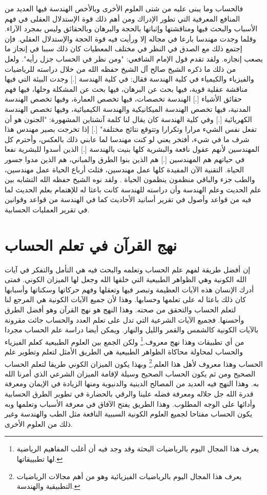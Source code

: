 فالحساب وما يبنى عليه من شتى العلوم الأخرى وبالأخص الهندسة فيها العديد من المنافع المعرفية التي تطور الإدراك ومن أهم ذلك قوة الإستدلال العقلى في فهم الأسباب والبحث فيها ومناقشتها وإثباتها بالحجة والبرهان وبالحقائق وليس بمجرد الآراء. وقلما وجدت مهندسا بارعا في مجاله إلا ورأيت فيه قوة الحجة والإستدلال العقلي. فإن إجتمع ذلك مع الصدق في النظر في مختلف المعطيات كان ذلك سببا في إنجاز ما يصعب إنجازه. ولقد تقدم قول الإمام الشافعي: "ومن نظر في الحساب جزل رأيه". ولعل من ذلك ما ذكره الشيخ صالح آل الشيخ حفظه الله من خلال دراسته للرياضيات والفيزياء والكيمياء في كلية الهندسة فقال: في كلية الهندسة [.] وجدت البيئة التي فيها مناقشة عقلية قوية، فيها بحث عن البرهان، فيها بحث عن المشكلة وحلها، فيها فهم حقائق الأشياء [.] الهندسة تخصصات، فيها تخصص العمارة، وفيها تخصص الهندسة المدنية، فيها تخصص الهندسة الميكانيكية والهندسة الكيميائية، وفيها تخصص الهندسة الكهريائية [.] وفي كلية الهندسة كان يقال لنا كلمة آنشتاين المشهورة: "الجنون هو أن تفعل نفس الشيء مرارا وتكرارا وتتوقع نتائج مختلفة" [.] إذا تخرجت بصير مهندس هذا شرف ما في شيء، أفتخر يعني لو كنت مهندسا لما عابني ذلك بالعكس، وأحترم كل المهندسين لأنهم عقول نافعة والبشرية كلها بنيت بالهندسة [.] الذين أسدوا للبشرية نفعا في حياتهم هم المهندسين [.] هم الذين بنوا الطرق والمباني، هم الذين مدوا جسور الحياة. التقنية الآن المفيدة كلها عمل مهندسين، فثلث أرباع الحياة عمل مهندسين، والطب جزء والباقي منظمون ينظمون الحياة \href{https://www.youtube.com/watch?v=kw_s0K_zbqc}{\faExternalLink}. ولقد نوه الشيخ حفظه الله التشابه بين علم الحديث وعلم الهندسة وأن دراسته للهندسة كانت باعثا له للإهتمام بعلم الحديث لما فيه من قواعد وأصول في تقرير أسانيد الأحاديث كما في الهندسة من قواعد وقوانين في تقرير العمليات الحسابية.

\section{نهج القرآن في تعلم الحساب}

إن أفضل طريقة لفهم علم الحساب وتعلمه والبحث فيه هي التأمل والتفكر في آيات الله الكونية وهي الظواهر الطبيعية التي خلقها الله وجعل لها الميزان الكوني. فمتى أدرك الإنسان هذه الآيات العظيمة وتبصر فيها وتعقلها وفهم حركاتها وسكناتها وأسبابها كان ذلك باعثا له على تعلمها وحسابها. وهذا لأن جميع الآيات الكونية هي المرجع لنا لتعلم الحساب والتحقق من صحته. وهذا النهج هو نهج القرآن وهو أفضل الطرق وأحسنها. فجميع الآيات الشرعية التي تدل على تعلم العدد والحساب جائت مقرونة بالآيات الكونية كالشمس والقمر والليل والنهار. ويمكن أيضا دراسة علم الحساب مجردا من أي تطبيقات وهذا نهج معروف.\footnote{يعرف هذا المجال اليوم بالرياضيات البحثة وقد وجد فيه أن أغلب المفاهيم الرياضية لها تطبييقاتها.} ولكن الجمع بين العلوم الطبيعية كعلم الفيزياء والحساب لمحاولة محاكاة الظواهر الطبيعية هي الطريق الأمثل لتعلم وتطوير علم الحساب وهذا معروف لأهل هذا العلم.\footnote{يعرف هذا المجال اليوم بالرياضيات الفيزيائية وهو من أهم مجالات الرياضيات التطبيقية والهندسة.} وبهذا يكون الميزان الكوني طريقا لتعلم الحساب الصحيح ومن ثم يكون الحساب الصحيح وسيلة لإقامة الميزان الشرعي الذي أمرنا الله به. وهذا النهج فيه العديد من المصالح الدينية والدنيوية ومنها الزيادة في الإيمان ومعرفة قدرة الله جل جلاله ومعرفة فضله علينا والرقي بالحضارة في تطوير الطرق الحسابية وأدائها على الوجه المطلوب. وهذا الطريق يفتح الآفاق في معرفة الأسباب وتعلمها وبه يكون الحساب مفتاحا لجميع العلوم الكونية السببية النافعة مثل الطب والهندسة وغير ذلك من العلوم الأخرى.

